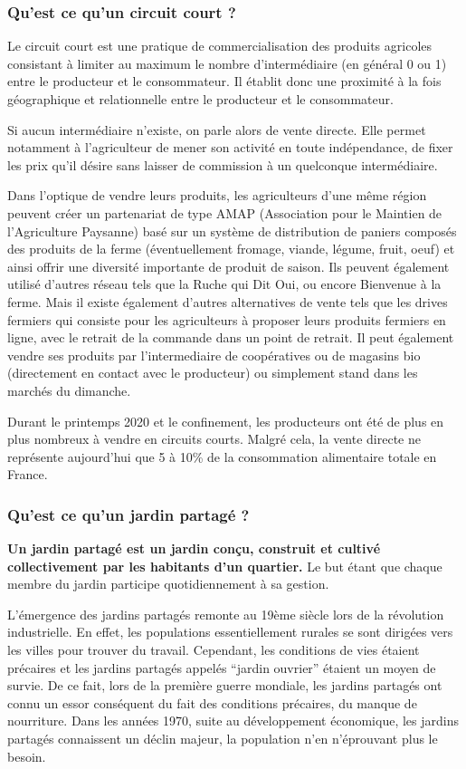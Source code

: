 \documentclass[french,a4paper]{article}
\begin{document}
\subsubsection{Qu’est ce qu’un circuit court ?}

Le circuit court est une pratique de commercialisation des produits agricoles consistant à limiter au maximum le nombre d’intermédiaire (en général 0 ou 1) entre le producteur et le consommateur. Il établit donc une proximité à la fois géographique et relationnelle entre le producteur et le consommateur.

Si aucun intermédiaire n’existe, on parle alors de vente directe. Elle permet notamment à l’agriculteur de mener son activité en toute indépendance, de fixer les prix qu’il désire sans laisser de commission à un quelconque intermédiaire.

Dans l’optique de vendre leurs produits, les agriculteurs d’une même région peuvent créer un partenariat de type AMAP (Association pour le Maintien de l'Agriculture Paysanne) basé sur un système de distribution de paniers  composés des produits de la ferme (éventuellement fromage, viande, légume, fruit, oeuf) et ainsi offrir une diversité importante de produit de saison. Ils peuvent également utilisé d’autres réseau tels que la Ruche qui Dit Oui, ou encore Bienvenue à la ferme. Mais il existe également d’autres alternatives de vente tels que les drives fermiers qui consiste pour les agriculteurs à proposer leurs produits fermiers en ligne, avec le retrait de la commande dans un point de retrait. Il peut également vendre ses produits par l’intermediaire de coopératives ou de magasins bio (directement en contact avec le producteur) ou simplement stand dans les marchés du dimanche.

Durant le printemps 2020 et le confinement, les producteurs ont été de plus en plus nombreux à vendre en circuits courts. Malgré cela, la vente directe ne représente aujourd’hui que 5 à 10\% de la consommation alimentaire totale en France.

\subsubsection{Qu’est ce qu’un jardin partagé ?}
\textbf{Un jardin partagé est un jardin conçu, construit et cultivé collectivement par les habitants d’un quartier.} Le but étant que chaque membre du jardin participe quotidiennement à sa gestion. 

L’émergence des jardins partagés remonte au 19ème siècle lors de la révolution industrielle. En effet, les populations essentiellement rurales se sont dirigées vers les villes pour trouver du travail. Cependant, les conditions de vies étaient précaires et les jardins partagés appelés  “jardin ouvrier” étaient un moyen de survie. De ce fait, lors de la première guerre mondiale, les jardins partagés ont connu un essor conséquent du fait des conditions précaires, du manque de nourriture.  Dans les années 1970, suite au développement économique, les jardins partagés connaissent un déclin majeur, la population n’en n’éprouvant plus le besoin. 
\end{document}
